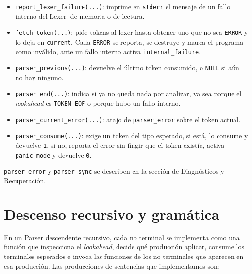 \documentclass[12pt,letterpaper]{article}
\begin{document}
\begin{itemize}
\item \texttt{report\_lexer\_failure(...)}: imprime en \texttt{stderr} el mensaje de un fallo interno del Lexer,
  de memoria o de lectura.
  
\item \texttt{fetch\_token(...)}: pide tokens al lexer hasta obtener uno que no sea   \texttt{ERROR} y lo deja
  en \texttt{current}. Cada \texttt{ERROR} se reporta, se destruye y marca el programa como inválido, ante un
  fallo interno activa \texttt{internal\_failure}.
  
\item \texttt{parser\_previous(...)}: devuelve el último token consumido, o \texttt{NULL} si aún no hay ninguno.
  
\item \texttt{parser\_end(...)}: indica si ya no queda nada por analizar, ya sea porque el \emph{lookahead} es
  \texttt{TOKEN\_EOF} o porque hubo un fallo interno.
  
\item \texttt{parser\_current\_error(...)}: atajo de \texttt{parser\_error} sobre el token actual.
  
\item \texttt{parser\_consume(...)}: exige un token del tipo esperado, si está, lo consume y devuelve \texttt{1},
  si no, reporta el error sin fingir que el token existía, activa \texttt{panic\_mode} y devuelve \texttt{0}.
\end{itemize}

\texttt{parser\_error} y \texttt{parser\_sync} se describen en la sección de Diagnósticos y Recuperación.


\bigskip


\section*{Descenso recursivo y gramática}

En un Parser descendente recursivo, cada no terminal se implementa como una función que inspecciona el
\emph{lookahead}, decide qué producción aplicar, consume los terminales esperados e invoca las funciones de los
no terminales que aparecen en esa producción. Las producciones de sentencias que implementamos son:
\end{document}
